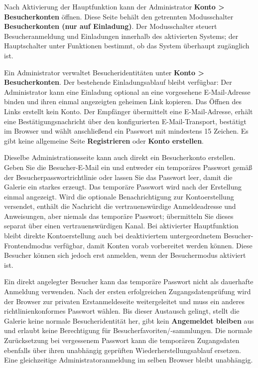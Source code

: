 \documentclass[11pt,a4paper]{article}
\newcommand{\ui}[1]{\textbf{#1}}
\begin{document}
Nach Aktivierung der Hauptfunktion kann der Administrator \ui{Konto >
Besucherkonten} öffnen. Diese Seite behält den getrennten Modusschalter
\ui{Besucherkonten (nur auf Einladung)}. Der Modusschalter steuert
Besucheranmeldung und Einladungen innerhalb des aktivierten Systems; der
Hauptschalter unter Funktionen bestimmt, ob das System überhaupt zugänglich ist.

Ein Administrator verwaltet Besucheridentitäten unter \ui{Konto >
Besucherkonten}. Der bestehende Einladungsablauf bleibt verfügbar: Der
Administrator kann eine Einladung optional an eine vorgesehene E-Mail-Adresse
binden und ihren einmal angezeigten geheimen Link kopieren. Das Öffnen des Links
erstellt kein Konto. Der Empfänger übermittelt eine E-Mail-Adresse, erhält eine
Bestätigungsnachricht über den konfigurierten E-Mail-Transport, bestätigt im
Browser und wählt anschließend ein Passwort mit mindestens 15 Zeichen. Es gibt
keine allgemeine Seite \ui{Registrieren} oder \ui{Konto erstellen}.

Dieselbe Administrationsseite kann auch direkt ein Besucherkonto erstellen.
Geben Sie die Besucher-E-Mail ein und entweder ein temporäres Passwort gemäß der
Besucherpasswortrichtlinie oder lassen Sie das Passwort leer, damit die Galerie
ein starkes erzeugt. Das temporäre Passwort wird nach der Erstellung einmal
angezeigt. Wird die optionale Benachrichtigung zur Kontoerstellung versendet,
enthält die Nachricht die vertrauenswürdige Anmeldeadresse und Anweisungen, aber
niemals das temporäre Passwort; übermitteln Sie dieses separat über einen
vertrauenswürdigen Kanal. Bei aktivierter Hauptfunktion bleibt direkte
Kontoerstellung auch bei deaktiviertem untergeordnetem Besucher-Frontendmodus
verfügbar, damit Konten vorab vorbereitet werden können. Diese Besucher können
sich jedoch erst anmelden, wenn der Besuchermodus aktiviert ist.

Ein direkt angelegter Besucher kann das temporäre Passwort nicht als dauerhafte
Anmeldung verwenden. Nach der ersten erfolgreichen Zugangsdatenprüfung wird der
Browser zur privaten Erstanmeldeseite weitergeleitet und muss ein anderes
richtlinienkonformes Passwort wählen. Bis dieser Austausch gelingt, stellt die
Galerie keine normale Besucheridentität her, gibt kein \ui{Angemeldet bleiben}
aus und erlaubt keine Berechtigung für Besucherfavoriten/-sammlungen. Die
normale Zurücksetzung bei vergessenem Passwort kann die temporären Zugangsdaten
ebenfalls über ihren unabhängig geprüften Wiederherstellungsablauf ersetzen.
Eine gleichzeitige Administratoranmeldung im selben Browser bleibt unabhängig.
\end{document}

